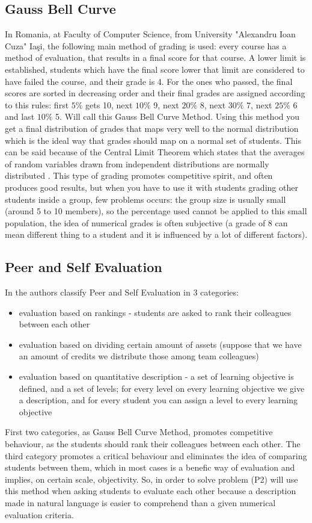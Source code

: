 \subsection{Gauss Bell Curve}
In Romania, at Faculty of Computer Science, from University "Alexandru Ioan Cuza" Ia\c si, the following main method of grading is used: every course has a method of evaluation, that results in a final score for that course. A lower limit is established, students which have the final score lower that limit are considered to have failed the course, and their grade is 4. For the ones who passed, the final scores are sorted in decreasing order and their final grades are assigned according to this rules: first $5\%$ gets 10, next $10\%$ 9, next $20\%$ 8, next $30\%$ 7, next $25\%$ 6 and last $10\%$ 5. Will call this Gauss Bell Curve Method. Using this method you get a final distribution of grades that maps very well to the normal distribution which is the ideal way that grades should map on a normal set of students. This can be said because of the Central Limit Theorem which states that the averages of random variables drawn from independent distributions are normally distributed \cite{wikiNormalDistr}. This type of grading promotes competitive spirit, and often produces good results, but when you have to use it with students grading other students inside a group, few problems occurs: the group size is usually small (around 5 to 10 members), so the percentage used cannot be applied to this small population, the idea of numerical grades is often subjective (a grade of 8 can mean different thing to a student and it is influenced by a lot of different factors).

\subsection{Peer and Self Evaluation}
In \cite{peev} the authors classify Peer and Self Evaluation in 3 categories:
\begin{itemize}
	\item evaluation based on rankings - students are asked to rank their colleagues between each other
	\item evaluation based on dividing certain amount of assets (suppose that we have an amount of credits we distribute those among team colleagues)
	\item evaluation based on quantitative description - a set of learning objective is defined, and a set of levels; for every level on every learning objective we give a description, and for every student you can assign a level to every learning objective
\end{itemize}
First two categories, as Gauss Bell Curve Method, promotes competitive behaviour, as the students should rank their colleagues between each other. The third category promotes a critical behaviour and eliminates the idea of comparing students between them, which in most cases is a benefic way of evaluation and implies, on certain scale, objectivity. So, in order to solve problem (P2) will use this method when asking students to evaluate each other because a description made in natural language is easier to comprehend than a given numerical evaluation criteria.
